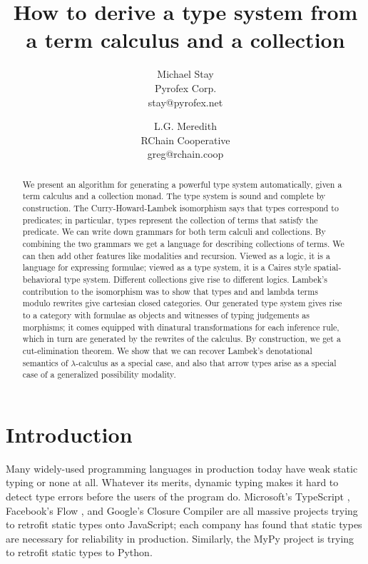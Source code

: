 \documentclass[a4paper,UKenglish]{article}
\newcommand{\lac}{$\lambda\mbox{-calculus}$\xspace}
\begin{document}
\title{How to derive a type system from a term calculus and a collection}
\author{
Michael Stay\\
  {Pyrofex Corp.}\\
  {\fontsize{8}{8}\selectfont stay@pyrofex.net}\\
  \and
  L.G. Meredith\\
  {RChain Cooperative}\\
  {\fontsize{8}{8}\selectfont greg@rchain.coop}
}
\maketitle
\begin{abstract}
  \noindent We present an algorithm for generating a powerful type system automatically, given a term calculus and a collection monad.  The type system is sound and complete by construction.  The Curry-Howard-Lambek isomorphism says that types correspond to predicates; in particular, types represent the collection of terms that satisfy the predicate.  We can write down grammars for both term calculi and collections. By combining the two grammars we get a language for describing collections of terms.  We can then add other features like modalities and recursion.  Viewed as a logic, it is a language for expressing formulae; viewed as a type system, it is a Caires style spatial-behavioral type system.  Different collections give rise to different logics.  Lambek's contribution to the isomorphism was to show that types and and lambda terms modulo rewrites give cartesian closed categories.  Our generated type system gives rise to a category with formulae as objects and witnesses of typing judgements as morphisms; it comes equipped with dinatural transformations for each inference rule, which in turn are generated by the rewrites of the calculus.  By construction, we get a cut-elimination theorem.  We show that we can recover Lambek's denotational semantics of \lac as a special case, and also that arrow types arise as a special case of a generalized possibility modality.
\end{abstract}

\EnableBpAbbreviations

\section{Introduction}

Many widely-used programming languages in production today have weak static typing or none at all.  Whatever its merits, dynamic typing makes it hard to detect type errors before the users of the program do.  Microsoft's TypeScript \cite{TypeScript},
Facebook's Flow \cite{Flow}, 
and Google's Closure Compiler \cite{Closure}
are all massive projects trying to retrofit static types onto JavaScript; each company has found that static types are necessary for reliability in production.  Similarly, the MyPy project \cite{MyPy}
is trying to retrofit static types to Python.
\end{document}
